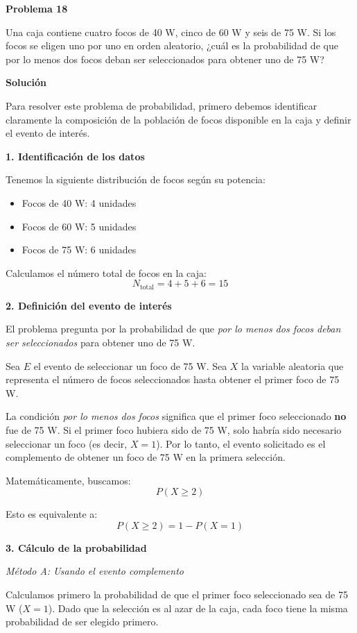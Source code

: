 \documentclass[a4paper]{article}
\begin{document}
\textbf{Problema 18}

Una caja contiene cuatro focos de 40 W, cinco de 60 W y seis de 75 W. Si los focos se eligen uno por uno en orden aleatorio, ¿cuál es la probabilidad de que por lo menos dos focos deban ser seleccionados para obtener uno de 75 W?

\vspace{0.5cm}

\textbf{Solución}

Para resolver este problema de probabilidad, primero debemos identificar claramente la composición de la población de focos disponible en la caja y definir el evento de interés.

\textbf{1. Identificación de los datos}

Tenemos la siguiente distribución de focos según su potencia:
\begin{itemize}
    \item Focos de 40 W: 4 unidades
    \item Focos de 60 W: 5 unidades
    \item Focos de 75 W: 6 unidades
\end{itemize}

Calculamos el número total de focos en la caja:
$$ N_{\text{total}} = 4 + 5 + 6 = 15 $$

\textbf{2. Definición del evento de interés}

El problema pregunta por la probabilidad de que \textit{por lo menos dos focos deban ser seleccionados} para obtener uno de 75 W.

Sea $E$ el evento de seleccionar un foco de 75 W.
Sea $X$ la variable aleatoria que representa el número de focos seleccionados hasta obtener el primer foco de 75 W.

La condición \textit{por lo menos dos focos} significa que el primer foco seleccionado \textbf{no} fue de 75 W. Si el primer foco hubiera sido de 75 W, solo habría sido necesario seleccionar un foco (es decir, $X = 1$). Por lo tanto, el evento solicitado es el complemento de obtener un foco de 75 W en la primera selección.

Matemáticamente, buscamos:
$$ P(X \ge 2) $$

Esto es equivalente a:
$$ P(X \ge 2) = 1 - P(X = 1) $$

\textbf{3. Cálculo de la probabilidad}

\textit{Método A: Usando el evento complemento}

Calculamos primero la probabilidad de que el primer foco seleccionado sea de 75 W ($X = 1$).
Dado que la selección es al azar de la caja, cada foco tiene la misma probabilidad de ser elegido primero.
\end{document}
